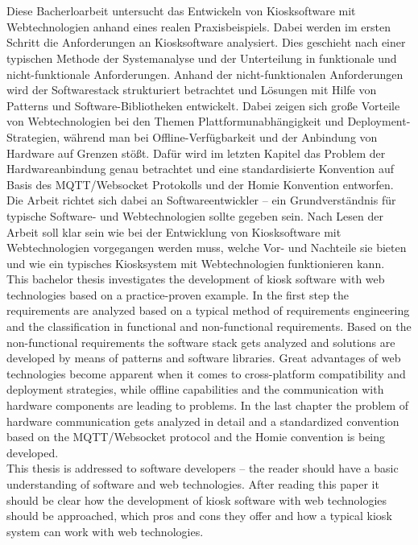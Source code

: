\chapter{\abstractname}

Diese Bacherloarbeit untersucht das Entwickeln von Kiosksoftware mit Webtechnologien
anhand eines realen Praxisbeispiels. Dabei werden im ersten Schritt die Anforderungen
an Kiosksoftware analysiert. Dies geschieht nach einer typischen Methode der Systemanalyse
und der Unterteilung in funktionale und nicht-funktionale Anforderungen. 
Anhand der nicht-funktionalen Anforderungen
wird der Softwarestack strukturiert betrachtet und Lösungen mit Hilfe von Patterns und 
Software-Bibliotheken entwickelt. 
Dabei zeigen sich große Vorteile von Webtechnologien bei den Themen
Plattformunabhängigkeit und Deployment-Strategien, während man bei Offline-Verfügbarkeit und der
Anbindung von Hardware auf Grenzen stößt. Dafür wird im letzten Kapitel das Problem der
Hardwareanbindung genau betrachtet und eine standardisierte Konvention auf
Basis des MQTT/Websocket Protokolls und der Homie Konvention entworfen.\\
Die Arbeit richtet sich dabei an Softwareentwickler -- ein Grundverständnis für typische 
Software- und Webtechnologien sollte gegeben sein. Nach Lesen der Arbeit soll klar sein
wie bei der Entwicklung von Kiosksoftware mit Webtechnologien vorgegangen werden muss, welche
Vor- und Nachteile sie bieten und wie ein typisches Kiosksystem mit Webtechnologien funktionieren
kann. \\

This bachelor thesis investigates the development of kiosk software with web technologies based
on a practice-proven example. In the first step the requirements are analyzed based on a typical
method of requirements engineering and the classification in functional and non-functional requirements. 
Based on the non-functional requirements the software stack gets analyzed and solutions are 
developed by means of patterns and software libraries. Great advantages of web technologies
become apparent when it comes to cross-platform compatibility and deployment strategies, while
offline capabilities and the communication with hardware components are leading to problems. 
In the last chapter the problem of hardware communication gets analyzed in detail
and a standardized convention based on the MQTT/Websocket protocol and the Homie convention 
is being developed.\\
This thesis is addressed to software developers -- the reader should have a basic understanding of
software and web technologies. After reading this paper it should be clear how the development of
kiosk software with web technologies should be approached, which pros and cons they offer and
how a typical kiosk system can work with web technologies. 
